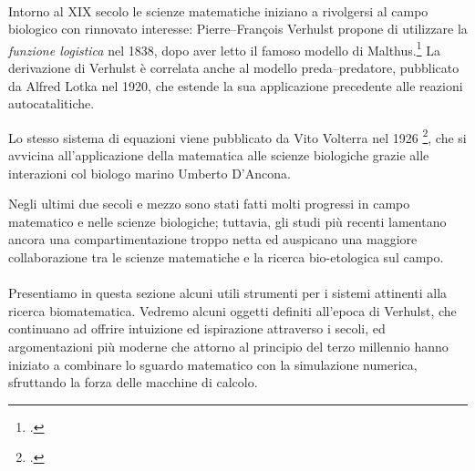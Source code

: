 \paragraph{}
Intorno al XIX secolo le scienze matematiche iniziano a rivolgersi al campo biologico con rinnovato interesse:
Pierre--François Verhulst propone di utilizzare la \emph{funzione logistica} nel 1838, dopo aver letto il famoso
modello di Malthus.\footcite{malthus1986essay}
La derivazione di Verhulst è correlata anche al modello preda--predatore, pubblicato da Alfred
Lotka nel 1920, che estende la sua applicazione precedente alle reazioni autocatalitiche.

Lo stesso sistema di equazioni viene pubblicato da Vito Volterra nel 1926
\footcite{vito},
che si avvicina all'applicazione della matematica alle scienze biologiche grazie alle interazioni col
biologo marino Umberto D'Ancona.

Negli ultimi due secoli e mezzo sono stati fatti molti progressi in campo matematico e nelle scienze biologiche;
tuttavia, gli studi più recenti lamentano ancora una compartimentazione troppo netta ed auspicano una maggiore
collaborazione tra le scienze matematiche e la ricerca bio-etologica sul campo.

\paragraph{}
Presentiamo in questa sezione alcuni utili strumenti per i sistemi attinenti alla ricerca biomatematica.
Vedremo alcuni oggetti definiti all'epoca di Verhulst, che continuano ad offrire intuizione ed ispirazione
attraverso i secoli, ed argomentazioni più moderne che attorno al principio del terzo millennio hanno iniziato
a combinare lo sguardo matematico con la simulazione numerica, sfruttando la forza delle macchine di calcolo.





